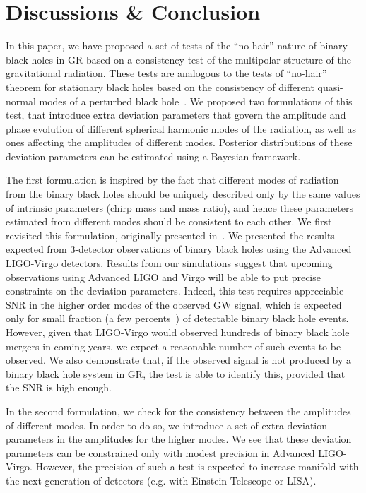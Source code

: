 \documentclass[prd,preprintnumbers,twocolumn,eqsecnum,floatfix,a4paper,nofootinbib,superscriptaddress]{revtex4}
\begin{document}
\section{Discussions \& Conclusion}
\label{sec:conclusions}

In this paper, we have proposed a set of tests of the ``no-hair'' nature of binary black holes in GR based on a consistency test of the multipolar structure of the gravitational radiation. These tests are analogous to the tests of ``no-hair'' theorem for stationary black holes based on the consistency of different quasi-normal modes of a perturbed black hole~\cite{Dreyer:2003bv}. We proposed two formulations of this test, that introduce extra deviation parameters that govern the amplitude and phase evolution of different spherical harmonic modes of the radiation, as well as ones affecting the amplitudes of different modes. Posterior distributions of these deviation parameters can be estimated using a Bayesian framework. 

The first formulation is inspired by the fact that different modes of radiation from the binary black holes should be uniquely described only by the same values of intrinsic parameters (chirp mass and mass ratio), and hence these parameters estimated from different modes should be consistent to each other. We first revisited this formulation, originally presented in~\cite{Dhanpal:2018ufk}. We presented the results expected from 3-detector observations of binary black holes using the Advanced LIGO-Virgo detectors. Results from our simulations suggest that upcoming observations using Advanced LIGO and Virgo will be able to put precise constraints on the deviation parameters. Indeed, this test requires appreciable SNR in the higher order modes of the observed GW signal, which is expected only for small fraction (a few percents~\cite{Dhanpal:2018ufk}) of detectable binary black hole events. However, given that LIGO-Virgo would observed hundreds of binary black hole mergers in coming years, we expect a reasonable number of such events to be observed. We also demonstrate that, if the observed signal is not produced by a binary black hole system in GR, the test is able to identify this, provided that the SNR is high enough. 


In the second formulation, we check for the consistency between the amplitudes of different modes. In order to do so, we introduce a set of extra deviation parameters in the amplitudes for the higher modes. We see that these deviation parameters can be constrained only with modest precision in Advanced LIGO-Virgo. However, the precision of such a test is expected to increase manifold with the next generation of detectors (e.g. with Einstein Telescope or LISA). 
\end{document}
